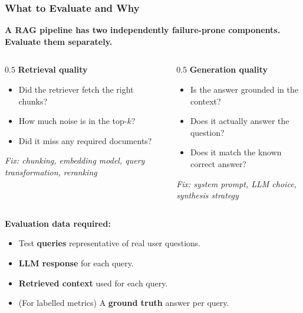 \begin{frame}[fragile]\frametitle{What to Evaluate and Why}

\textbf{A RAG pipeline has two independently failure-prone components. Evaluate them separately.}

\vspace{0.3em}
\begin{columns}
  \begin{column}[T]{0.5\linewidth}
    \textbf{Retrieval quality}
    \begin{itemize}
      \item Did the retriever fetch the right chunks?
      \item How much noise is in the top-$k$?
      \item Did it miss any required documents?
    \end{itemize}
    \vspace{0.2em}
    \textit{Fix: chunking, embedding model, query transformation, reranking}
  \end{column}
  \begin{column}[T]{0.5\linewidth}
    \textbf{Generation quality}
    \begin{itemize}
      \item Is the answer grounded in the context?
      \item Does it actually answer the question?
      \item Does it match the known correct answer?
    \end{itemize}
    \vspace{0.2em}
    \textit{Fix: system prompt, LLM choice, synthesis strategy}
  \end{column}
\end{columns}

\vspace{0.4em}
\textbf{Evaluation data required:}
\begin{itemize}
  \item Test \textbf{queries} representative of real user questions.
  \item \textbf{LLM response} for each query.
  \item \textbf{Retrieved context} used for each query.
  \item (For labelled metrics) A \textbf{ground truth} answer per query.
\end{itemize}

\end{frame}

